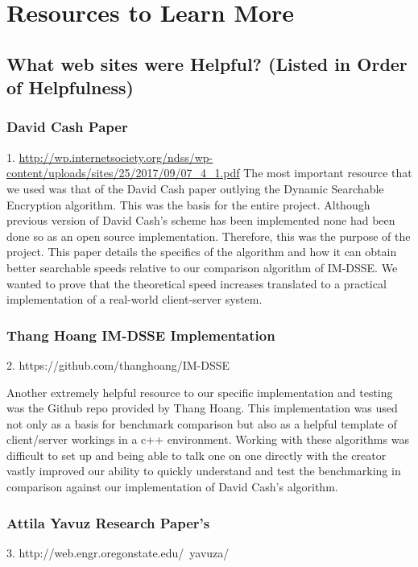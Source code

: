 
\chapter{Resources to Learn More}

\section{ What web sites were Helpful? (Listed in Order of Helpfulness)}

\subsection{David Cash Paper}
1. \url{http://wp.internetsociety.org/ndss/wp-content/uploads/sites/25/2017/09/07_4_1.pdf}
The most important resource that we used was that of the David Cash paper outlying the Dynamic Searchable Encryption algorithm. This was the basis for the entire project. Although previous version of David Cash’s scheme has been implemented none had been done so as an open source implementation. Therefore, this was the purpose of the project. This paper details the specifics of the algorithm and how it can obtain better searchable speeds relative to our comparison algorithm of IM-DSSE. We wanted to prove that the theoretical speed increases translated to a practical implementation of a real-world client-server system.

\subsection{Thang Hoang IM-DSSE Implementation}
2. https://github.com/thanghoang/IM-DSSE

Another extremely helpful resource to our specific implementation and testing was the Github repo provided by Thang Hoang. This implementation was used not only as a basis for benchmark comparison but also as a helpful template of client/server workings in a c++ environment. Working with these algorithms was difficult to set up and being able to talk one on one directly with the creator vastly improved our ability to quickly understand and test the benchmarking in comparison against our implementation of David Cash’s algorithm.

\subsection{Attila Yavuz Research Paper's}
3. http://web.engr.oregonstate.edu/~yavuza/

